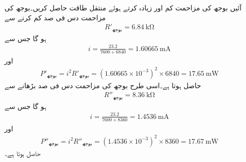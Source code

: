 آئیں بوجھ کی مزاحمت کم اور زیادہ کرتے ہوئے منتقل طاقت حاصل کریں۔بوجھ کی مزاحمت دس فی صد کم کرنے سے 
\begin{align*}
R'_{\text{بوجھ}} =\SI{6.84}{\kilo\ohm}
\end{align*}
ہو گا جس سے
\begin{align*}
i=\frac{23.2}{7600+6840}=\SI{1.60665}{\milli\ampere}
\end{align*}
اور
\begin{align*}
P'_{\text{بوجھ}}= i^2 R'_{\text{بوجھ}} = \left(1.60665\times 10^{-3}\right)^2 \times 6840=\SI{17.65}{\milli\watt}
\end{align*}
حاصل ہوتا ہے۔اسی طرح بوجھ کی مزاحمت دس فی صد بڑھانے سے 
\begin{align*}
R''_{\text{بوجھ}} =\SI{8.36}{\kilo\ohm}
\end{align*}
ہو گا جس سے
\begin{align*}
i=\frac{23.2}{7600+8360}=\SI{1.4536}{\milli\ampere}
\end{align*}
اور
\begin{align*}
P''_{\text{بوجھ}}= i^2 R''_{\text{بوجھ}} = \left(1.4536\times 10^{-3}\right)^2 \times 8360=\SI{17.67}{\milli\watt}
\end{align*}
حاصل ہوتا ہے۔

